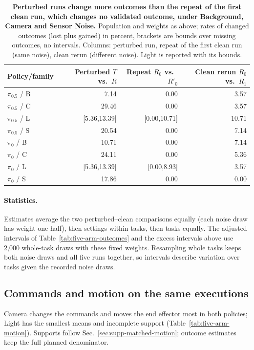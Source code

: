 \begin{table}[t]
\caption{\textbf{Perturbed runs change more outcomes than the repeat of the first clean run, which changes no validated outcome, under Background, Camera and Sensor Noise.} Population and weights as above; rates of changed outcomes (lost plus gained) in percent, brackets are bounds over missing outcomes, no intervals. Columns: perturbed run, repeat of the first clean run (same noise), clean rerun (different noise). Light is reported with its bounds.}

\centering\small
\setlength{\tabcolsep}{3.4pt}
\begin{tabular}{lrrr}
\toprule
Policy/family & \shortstack{Perturbed\\$T$ vs.\ $R$} & \shortstack{Repeat\\$R_0$ vs.\ $R'_0$} & \shortstack{Clean rerun\\$R_0$ vs.\ $R_1$}\\
\midrule
$\pi_{0.5}$ / B & 7.14 & 0.00 & 3.57\\
$\pi_{0.5}$ / C & 29.46 & 0.00 & 3.57\\
$\pi_{0.5}$ / L & [5.36,13.39] & [0.00,10.71] & 10.71\\
$\pi_{0.5}$ / S & 20.54 & 0.00 & 7.14\\
$\pi_0$ / B & 10.71 & 0.00 & 7.14\\
$\pi_0$ / C & 24.11 & 0.00 & 5.36\\
$\pi_0$ / L & [5.36,13.39] & [0.00,8.93] & 3.57\\
$\pi_0$ / S & 17.86 & 0.00 & 0.00\\
\bottomrule
\end{tabular}

\label{tab:five-arm-flips}
\end{table}

\paragraph{Statistics.}
Estimates average the two perturbed--clean comparisons equally (each noise draw has weight one half), then settings within tasks, then tasks equally. The adjusted intervals of Table~\ref{tab:five-arm-outcomes} and the excess intervals above use 2,000 whole-task draws with these fixed weights. Resampling whole tasks keeps both noise draws and all five runs together, so intervals describe variation over tasks given the recorded noise draws.

\subsection{Commands and motion on the same executions}
Camera changes the commands and moves the end effector most in both policies; Light has the smallest means and incomplete support (Table~\ref{tab:five-arm-motion}). Supports follow Sec.~\ref{sec:supp-matched-motion}; outcome estimates keep the full planned denominator.

